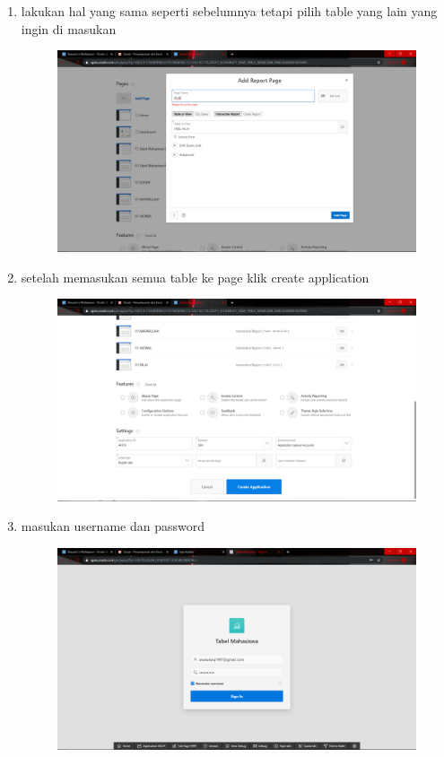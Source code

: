 \begin{enumerate}
\item lakukan hal yang sama seperti sebelumnya tetapi pilih table yang lain yang ingin di masukan
\begin{figure}[H]
    \centering
    \includegraphics[scale=0.1]{figures/25}
    \caption{}
    \label{Automatic3}
\end{figure}

\item setelah memasukan semua table ke page klik create application
\begin{figure}[H]
    \centering
    \includegraphics[scale=0.1]{figures/26}
    \caption{}
    \label{Automatic4}
\end{figure}

\item masukan username dan password
\begin{figure}[H]
    \centering
    \includegraphics[scale=0.1]{figures/27}
    \caption{}
    \label{Variable Explorer}
\end{figure}




\end{enumerate}
